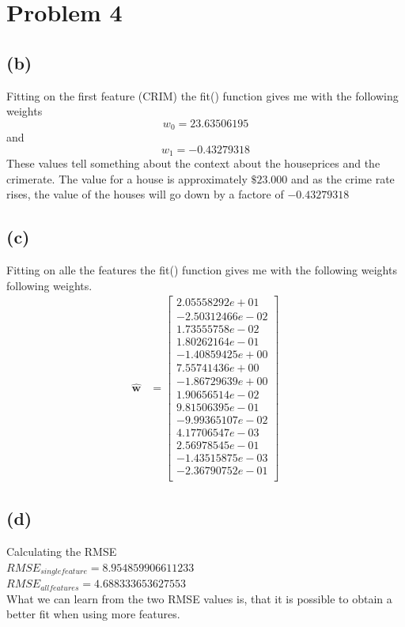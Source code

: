 \section{Problem 4}

\subsection{(b)}
Fitting on the first feature (CRIM) the fit() function gives me with the following weights
$$ w_{0} = 23.63506195$$ and $$w_{1} = -0.43279318$$
These values tell something about the context about the houseprices and the crimerate. The value
for a house is approximately $\$ 23.000 $ and as the crime rate rises, the value of the houses will
go down by a factore of $ -0.43279318 $

\subsection{(c)}
Fitting on alle the features the fit() function gives me with the following weights following weights.\\
\begin{align}
    \hat{\textbf{w}} &= \begin{bmatrix}
    2.05558292e+01\\
    -2.50312466e-02\\
    1.73555758e-02\\
    1.80262164e-01\\
    -1.40859425e+00\\
    7.55741436e+00\\
    -1.86729639e+00\\
    1.90656514e-02\\
    9.81506395e-01\\
    -9.99365107e-02\\
    4.17706547e-03\\
    2.56978545e-01\\
    -1.43515875e-03\\
    -2.36790752e-01\\
        \end{bmatrix}
\end{align}
\subsection{(d)}
Calculating the RMSE\\
$RMSE_{singlefeature} = 8.954859906611233$\\
$RMSE_{allfeatures} = 4.688333653627553$\\
What we can learn from the two RMSE values is, that it is possible to obtain a better fit when using more features.

